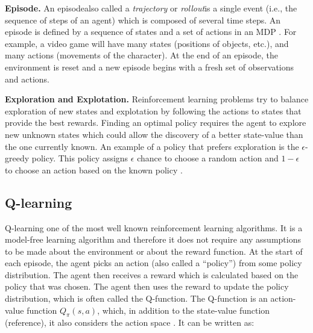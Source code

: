 
\textbf{Episode.}
An episode\textemdash also called a \textit{trajectory} or \textit{rollout}\textemdash is a single event (i.e., the sequence of steps of an agent) which is composed of several time steps. An episode is defined by a sequence of states and a set of actions in an MDP \cite{sutton2018reinforcement}. For example, a video game will have many states (positions of objects, etc.), and many actions (movements of the character). 
At the end of an episode, the environment is reset and a new episode begins with a fresh set of observations and actions.

\textbf{Exploration and Explotation.}
Reinforcement learning problems try to balance exploration of new states and explotation by following the actions to states that provide the best rewards. Finding an optimal policy requires the agent to explore new unknown states which could allow the discovery of a better state-value than the one currently known. 
An example of a policy that prefers exploration is the $\epsilon$-greedy policy. This policy assigns $\epsilon$ chance to choose a random action and $1-\epsilon$ to choose an action based on the known policy \cite{sutton2018reinforcement}.  


\subsection{Q-learning} \label{chap2:q-learning}
Q-learning one of the most well known reinforcement learning algorithms. It is a model-free learning algorithm and therefore it does not require any assumptions to be made about the environment or about the reward function.
At the start of each episode, the agent picks an action (also called a “policy”) from some policy distribution. The agent then receives a reward which is calculated based on the policy that was chosen. The agent then uses the reward to update the policy distribution, which is often called the Q-function. The Q-function is an action-value function $Q_\pi(s,a)$, which, in addition to the state-value function (reference), it also considers the action space \cite{sutton2018reinforcement}. It can be written as:

